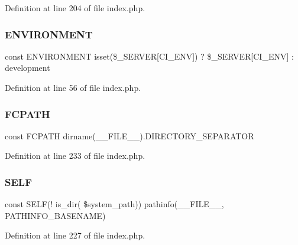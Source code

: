 Definition at line 204 of file index.\+php.

\mbox{\label{index_8php_a8757a57d09df5349f8b93b2083e29a1e}} 
\subsubsection{\texorpdfstring{ENVIRONMENT}{ENVIRONMENT}}
{\footnotesize\ttfamily const E\+N\+V\+I\+R\+O\+N\+M\+E\+NT isset(\$\+\_\+\+S\+E\+R\+V\+ER\mbox{[}\textquotesingle{}C\+I\+\_\+\+E\+NV\textquotesingle{}\mbox{]}) ? \$\+\_\+\+S\+E\+R\+V\+ER\mbox{[}\textquotesingle{}C\+I\+\_\+\+E\+NV\textquotesingle{}\mbox{]} \+: \textquotesingle{}development\textquotesingle{}}



Definition at line 56 of file index.\+php.

\mbox{\label{index_8php_ae486546e58b2603595efedf9f95b3926}} 
\subsubsection{\texorpdfstring{FCPATH}{FCPATH}}
{\footnotesize\ttfamily const F\+C\+P\+A\+TH dirname(\+\_\+\+\_\+\+F\+I\+L\+E\+\_\+\+\_\+).D\+I\+R\+E\+C\+T\+O\+R\+Y\+\_\+\+S\+E\+P\+A\+R\+A\+T\+OR}



Definition at line 233 of file index.\+php.

\mbox{\label{index_8php_a6f163f65a35aa02c02a5ff21337053d8}} 
\subsubsection{\texorpdfstring{SELF}{SELF}}
{\footnotesize\ttfamily const S\+E\+LF(! is\+\_\+dir( \$system\+\_\+path)) pathinfo(\+\_\+\+\_\+\+F\+I\+L\+E\+\_\+\+\_\+, P\+A\+T\+H\+I\+N\+F\+O\+\_\+\+B\+A\+S\+E\+N\+A\+ME)}



Definition at line 227 of file index.\+php.

\mbox{\label{index_8php_ab645ae0961792b1f2b4b83f89cb95fa5}} 
